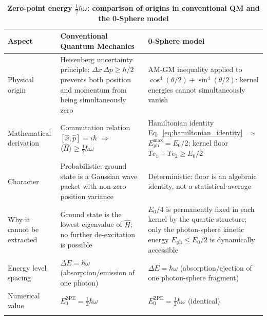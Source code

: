 \documentclass[%
 reprint, amsmath,amssymb, aps, prb, ]{revtex4-2}
\numberwithin{equation}{section}
\begin{document}
\begin{table}[t!]
\centering
\caption{\textbf{Zero-point energy $\tfrac{1}{2}\hbar\omega$: comparison of origins in conventional QM and the 0-Sphere model}}
\label{tab:zpe_comparison}
\renewcommand{\arraystretch}{1.4}
\normalsize
\begin{tabular}{p{3.8cm}p{5.5cm}p{5.7cm}}
\toprule
\textbf{Aspect} & \textbf{Conventional Quantum Mechanics} & \textbf{0-Sphere model} \\
\midrule
Physical origin
& Heisenberg uncertainty principle: $\Delta x\,\Delta p \geq \hbar/2$ prevents both position and momentum from being simultaneously zero
& AM-GM inequality applied to $\cos^4(\theta/2) + \sin^4(\theta/2)$: kernel energies cannot simultaneously vanish \\
\addlinespace[0.3cm]
Mathematical derivation
& Commutation relation $[\hat{x},\hat{p}] = i\hbar$ $\Rightarrow$ $\langle\hat{H}\rangle \geq \tfrac{1}{2}\hbar\omega$
& Hamiltonian identity Eq.~\eqref{eq:hamiltonian_identity} $\Rightarrow$ $E_{\text{ph}}^{\max} = E_0/2$; kernel floor $Te_1 + Te_2 \geq E_0/2$ \\
\addlinespace[0.3cm]
Character
& Probabilistic: ground state is a Gaussian wave packet with non-zero position variance
& Deterministic: floor is an algebraic identity, not a statistical average \\
\addlinespace[0.3cm]
Why it cannot be extracted
& Ground state is the lowest eigenvalue of $\hat{H}$; no further de-excitation is possible
& $E_0/4$ is permanently fixed in each kernel by the quartic structure; only the photon-sphere kinetic energy $E_{\text{ph}} \leq E_0/2$ is dynamically accessible \\
\addlinespace[0.3cm]
Energy level spacing
& $\Delta E = \hbar\omega$ (absorption/emission of one photon)
& $\Delta E = \hbar\omega$ (absorption/ejection of one photon-sphere fragment) \\
\addlinespace[0.3cm]
Numerical value
& $E_0^{\text{ZPE}} = \tfrac{1}{2}\hbar\omega$
& $E_0^{\text{ZPE}} = \tfrac{1}{2}\hbar\omega$ (identical) \\
\addlinespace[0.2cm]
\bottomrule
\end{tabular}
\vspace{0.2cm}
\begin{minipage}{0.95\textwidth}
\justifying\normalsize

\end{minipage}
\end{table}
\end{document}
